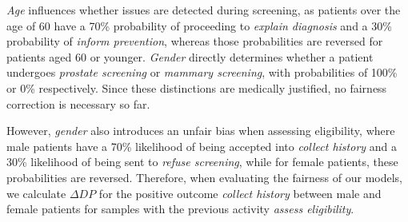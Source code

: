 \textit{Age} influences whether issues are detected during screening,
as patients over the age of 60 have a 70\% probability of proceeding to \textit{explain diagnosis}
and a 30\% probability of \textit{inform prevention},
whereas those probabilities are reversed for patients aged 60 or younger.
\textit{Gender} directly determines whether a patient undergoes \textit{prostate screening} or \textit{mammary screening},
with probabilities of 100\% or 0\% respectively.
Since these distinctions are medically justified, no fairness correction is necessary so far.  

However, \textit{gender} also introduces an unfair bias when assessing eligibility,
where male patients have a 70\% likelihood of being accepted into \textit{collect history}
and a 30\% likelihood of being sent to \textit{refuse screening},
while for female patients, these probabilities are reversed.
Therefore, when evaluating the fairness of our models,
we calculate $\Delta \textit{DP}$ for the positive outcome
\textit{collect history} between male and female patients for samples with the previous activity \textit{assess eligibility}.

